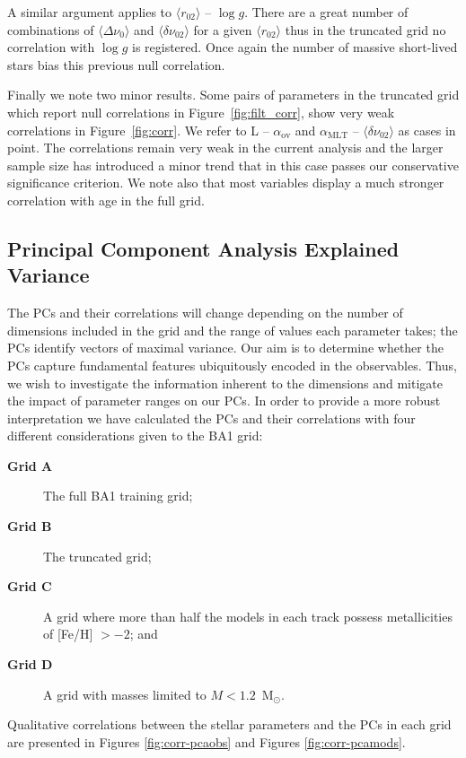 A similar argument applies to ${\langle r_{02}\rangle}$ -- ${\log{} g}$. There are a great number of combinations of ${\langle\Delta\nu_0\rangle}$ and
${\langle\delta\nu_{02}\rangle}$ for a given ${\langle r_{02}\rangle}$ thus in the truncated grid no correlation with ${\log{} g}$ is registered. 
Once again the number of massive short-lived stars bias this previous null correlation. 


Finally we note two minor results. Some pairs of parameters in the truncated grid which report null correlations in  Figure~\ref{fig:filt_corr},  show very weak correlations in Figure~\ref{fig:corr}. 
We refer to  L -- $\alpha_{\text{ov}}$ and $\alpha_{\text{MLT}}$ -- ${\langle\delta\nu_{02}\rangle}$ as cases in point. The correlations remain very weak in the current analysis and the larger sample size has introduced a minor trend that in this case passes our conservative significance criterion. We note also that most variables display a much stronger correlation with age in the full grid. 
 






\subsection{Principal Component Analysis Explained Variance} 
\label{sec:fullPCA}
%

The PCs and their correlations will change depending on the number of dimensions included in the grid and the range of values each parameter takes; the PCs identify vectors of maximal variance. 
Our aim is to determine whether the PCs capture fundamental features ubiquitously encoded in the observables. 
Thus, we wish to investigate the information inherent to the dimensions and mitigate the impact of parameter ranges on our PCs. 
In order to provide a more robust interpretation we have calculated the PCs and their correlations with four different considerations given to the BA1 grid:
\begin{description}
    \item[\textbf{Grid A}] The full BA1 training grid;
    \item[\textbf{Grid B}] The truncated grid;
    \item[\textbf{Grid C}] A grid where more than half the models in each track possess metallicities of [Fe/H] $> -2$; and
     \item[\textbf{Grid D}] A grid with masses limited to ${M < 1.2}$~M$_{\odot}$.
\end{description}
Qualitative correlations between the stellar parameters and the PCs in each grid are presented in Figures \ref{fig:corr-pcaobs} and Figures \ref{fig:corr-pcamods}.


